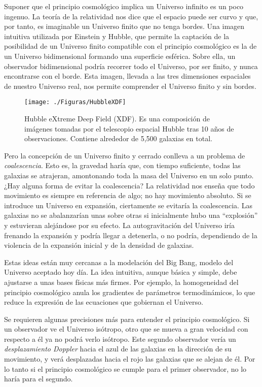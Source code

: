 \documentclass[a4paper,openright,12pt]{book}
\begin{document}
Suponer que el principio cosmológico implica un Universo infinito es un poco ingenuo. La teoría de la relatividad nos dice que el espacio puede ser curvo y que, por tanto, es imaginable un Universo finito que no tenga bordes. Una imagen intuitiva utilizada por Einstein y Hubble, que permite la captación de la posibilidad de un Universo finito compatible con el principio cosmológico es la de un Universo bidimensional formando una superficie esférica. Sobre ella, un observador bidimensional podría recorrer todo el Universo, por ser finito, y nunca encontrarse con el borde. Esta imagen, llevada a las tres dimensiones espaciales de nuestro Universo real, nos permite comprender el Universo finito y sin bordes.

\begin{figure}
\centering
\texttt{[image: ./Figuras/HubbleXDF]}
\caption{\footnotesize{Hubble eXtreme Deep Field (XDF). Es una composición de imágenes tomadas por el telescopio espacial Hubble tras 10 años de observaciones. Contiene alrededor de 5,500 galaxias en total.}}
\end{figure}

Pero la concepción de un Universo finito y cerrado conlleva a un problema de \textit{coalescencia}. Esto es, la gravedad haría que, con tiempo suficiente, todas las galaxias se atrajeran, amontonando toda la masa del Universo en un solo punto. ¿Hay alguna forma de evitar la coalescencia? La relatividad nos enseña que todo movimiento es siempre en referencia de algo; no hay movimiento absoluto. Si se introduce un Universo en expansión, ciertamente se evitaría la coalescencia. Las galaxias no se abalanzarían unas sobre otras si inicialmente hubo una ``explosión'' y estuvieran alejándose por su efecto. La autogravitación del Universo iría frenando la expansión y podría llegar a detenerla, o no podría, dependiendo de la violencia de la expansión inicial y de la densidad de galaxias.

Estas ideas están muy cercanas a la modelación del Big Bang, modelo del Universo aceptado hoy día. La idea intuitiva, aunque básica y simple, debe ajustarse a unas bases físicas más firmes. Por ejemplo, la homogeneidad del principio cosmológico anula los gradientes de parámetros termodinámicos, lo que reduce la expresión de las ecuaciones que gobiernan el Universo.

Se requieren algunas precisiones más para entender el principio cosmológico. Si un observador ve el Universo isótropo, otro que se mueva a gran velocidad con respecto a él ya no podrá verlo isótropo. Este segundo observador vería un \textit{desplazamiento Doppler} hacia el azul de las galaxias en la dirección de su movimiento, y verá desplazadas hacia el rojo las galaxias que se alejan de él. Por lo tanto si el principio cosmológico se cumple para el primer observador, no lo haría para el segundo.
\end{document}
